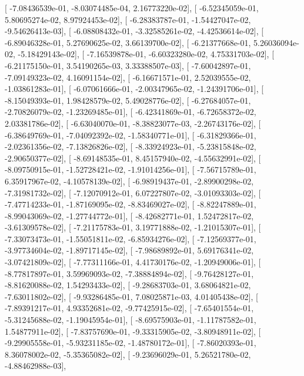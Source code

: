 \documentclass{article}
\begin{document}
       [ -7.08436539e-01,  -8.03074485e-04,   2.16773220e-02],
       [ -6.52345059e-01,   5.80695274e-02,   8.97924453e-02],
       [ -6.28383787e-01,  -1.54427047e-02,  -9.54626413e-03],
       [ -6.08808432e-01,  -3.32585261e-02,  -4.42536614e-02],
       [ -6.89046328e-01,   5.27690625e-02,   3.66139700e-02],
       [ -6.21377668e-01,   5.26036094e-02,  -5.18429143e-02],
       [ -7.16539878e-01,  -6.60323280e-02,   4.75331703e-02],
       [ -6.21175150e-01,   3.54190265e-03,   3.33388507e-03],
       [ -7.60042897e-01,  -7.09149323e-02,   4.16091154e-02],
       [ -6.16671571e-01,   2.52039555e-02,  -1.03861283e-01],
       [ -6.07061666e-01,  -2.00347965e-02,  -1.24391706e-01],
       [ -8.15049393e-01,   1.98428579e-02,   5.49028776e-02],
       [ -6.27684057e-01,  -2.70826079e-02,  -1.23269485e-01],
       [ -6.42341869e-01,  -6.72658372e-02,   2.03381786e-02],
       [ -6.63040070e-01,  -8.38823077e-03,  -2.26743176e-02],
       [ -6.38649769e-01,  -7.04092392e-02,  -1.58340771e-01],
       [ -6.31829366e-01,  -2.02361356e-02,  -7.13826826e-02],
       [ -8.33924923e-01,  -5.23815848e-02,  -2.90650377e-02],
       [ -8.69148535e-01,   8.45157940e-02,  -4.55632991e-02],
       [ -8.09750915e-01,  -1.52728421e-02,  -1.91014256e-01],
       [ -7.56715789e-01,   6.35917967e-02,  -4.10578139e-02],
       [ -6.98919437e-01,  -2.89900298e-02,  -7.31981732e-02],
       [ -7.12070912e-01,   6.07227807e-02,  -3.01093303e-02],
       [ -7.47714233e-01,  -1.87169095e-02,  -8.83469027e-02],
       [ -8.82247889e-01,  -8.99043069e-02,  -1.27744772e-01],
       [ -8.42682771e-01,   1.52472817e-02,  -3.61309578e-02],
       [ -7.21175783e-01,   3.19771888e-02,  -1.21015307e-01],
       [ -7.33073473e-01,  -1.55051811e-02,  -6.85934276e-02],
       [ -7.12569377e-01,  -3.97734604e-02,  -1.89717145e-02],
       [ -7.98689892e-01,   5.69176341e-02,  -3.07421809e-02],
       [ -7.77311166e-01,   4.41730176e-02,  -1.20949006e-01],
       [ -8.77817897e-01,   3.59969093e-02,  -7.38884894e-02],
       [ -9.76428127e-01,  -8.81620088e-02,   1.54293433e-02],
       [ -9.28683703e-01,   3.68064821e-02,  -7.63011802e-02],
       [ -9.93286485e-01,   7.08025871e-03,   4.01405438e-02],
       [ -7.89391217e-01,   4.93352681e-02,  -9.77425915e-02],
       [ -7.65401554e-01,  -5.31245688e-02,  -1.19045954e-01],
       [ -8.69575903e-01,  -1.11787582e-01,   1.54877911e-02],
       [ -7.83757690e-01,  -9.33315905e-02,  -3.80948911e-02],
       [ -9.29905558e-01,  -5.93231185e-02,  -1.48780172e-01],
       [ -7.86020393e-01,   8.36078002e-02,  -5.35365082e-02],
       [ -9.23696029e-01,   5.26521780e-02,  -4.88462988e-03],
\end{document}
